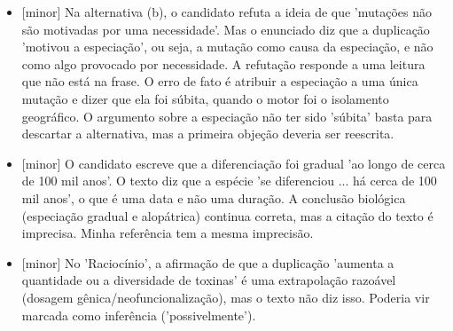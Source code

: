 \documentclass{article}%
\begin{document}
\begin{itemize}%
\item%
{[}minor{]} Na alternativa (b), o candidato refuta a ideia de que 'mutações não são motivadas por uma necessidade'. Mas o enunciado diz que a duplicação 'motivou a especiação', ou seja, a mutação como causa da especiação, e não como algo provocado por necessidade. A refutação responde a uma leitura que não está na frase. O erro de fato é atribuir a especiação a uma única mutação e dizer que ela foi súbita, quando o motor foi o isolamento geográfico. O argumento sobre a especiação não ter sido 'súbita' basta para descartar a alternativa, mas a primeira objeção deveria ser reescrita.%
\item%
{[}minor{]} O candidato escreve que a diferenciação foi gradual 'ao longo de cerca de 100 mil anos'. O texto diz que a espécie 'se diferenciou ... há cerca de 100 mil anos', o que é uma data e não uma duração. A conclusão biológica (especiação gradual e alopátrica) continua correta, mas a citação do texto é imprecisa. Minha referência tem a mesma imprecisão.%
\item%
{[}minor{]} No 'Raciocínio', a afirmação de que a duplicação 'aumenta a quantidade ou a diversidade de toxinas' é uma extrapolação razoável (dosagem gênica/neofuncionalização), mas o texto não diz isso. Poderia vir marcada como inferência ('possivelmente').%
\end{itemize}%
\end{document}
